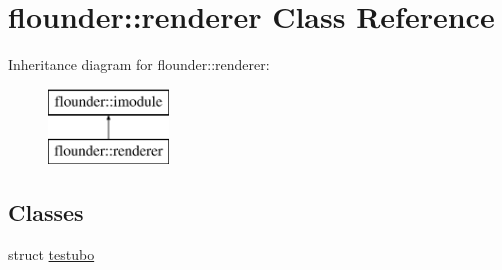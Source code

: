 \hypertarget{classflounder_1_1renderer}{}\section{flounder\+:\+:renderer Class Reference}
\label{classflounder_1_1renderer}
Inheritance diagram for flounder\+:\+:renderer\+:\begin{figure}[H]
\begin{center}
\leavevmode
\includegraphics[height=2.000000cm]{classflounder_1_1renderer}
\end{center}
\end{figure}
\subsection*{Classes}
\begin{DoxyCompactItemize}
\item 
struct \hyperlink{structflounder_1_1renderer_1_1testubo}{testubo}
\end{DoxyCompactItemize}
